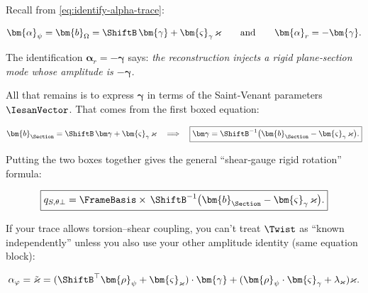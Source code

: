 
\begin{Aside}



Recall from \eqref{eq:identify-alpha-trace}:

\begin{equation}
\bm{\alpha}_{\psi}=\bm{b}_{\Omega}
=
\ShiftB\,\bm{\gamma}+\bm{\varsigma}_{\gamma}\,\varkappa
\qquad\text{and}\qquad
\bm{\alpha}_{r}=-\bm{\gamma}.
\end{equation}

The identification \(\bm\alpha_r=-\bm\gamma\) says: \emph{the
reconstruction injects a rigid plane‑section mode whose amplitude is
\(-\bm\gamma\).}

All that remains is to express \(\bm\gamma\) in terms of the Saint‑Venant
parameters \(\IesanVector\).
That comes from the first boxed equation:

\[\bm{b}_{\Section}=\ShiftB\,\bm\gamma+\bm{\varsigma}_{\gamma}\,\varkappa
\quad\Longrightarrow\quad
\boxed{
\bm\gamma=\ShiftB^{-1}\bigl(\bm{b}_{\Section}-\bm{\varsigma}_{\gamma}\,\varkappa\bigr).
}\]

Putting the two boxes together gives the general ``shear‑gauge rigid
rotation'' formula:

\[
\boxed{
q_{S,\theta\perp}
=
\FrameBasis\times\,\ShiftB^{-1}\bigl(\bm{b}_{\Section}-\bm{\varsigma}_{\gamma}\,\varkappa\bigr).
}
\]


If your trace allows torsion--shear coupling, you can't treat
\(\Twist\) as ``known independently'' unless you also use your other
amplitude identity (same equation block):

\[\alpha_{\varphi}=\tilde\varkappa
=
(\ShiftB^{\top}\bm{\rho}_{\psi}+ \bm{\varsigma}_{\varkappa})\cdot\bm{\gamma}
+(\bm{\rho}_{\psi}\cdot\bm{\varsigma}_{\gamma}+\lambda_{\varkappa})\varkappa.\]


\end{Aside}

